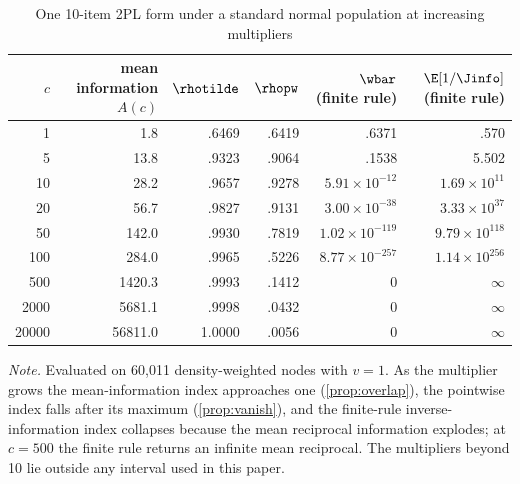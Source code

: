 \begin{table}[!htbp]
\centering
\caption{One 10-item 2PL form under a standard normal population at increasing multipliers}
\label{tab:guttman}
\small
\begin{tabular}{rrrrrr}
\toprule
$c$ & mean information $A(c)$ & $\rhotilde$ & $\rhopw$ & $\wbar$ (finite rule) & $\E[1/\Jinfo]$ (finite rule) \\
\midrule
1 & 1.8 & .6469 & .6419 & .6371 & .570 \\
5 & 13.8 & .9323 & .9064 & .1538 & 5.502 \\
10 & 28.2 & .9657 & .9278 & $5.91\times10^{-12}$ & $1.69\times10^{11}$ \\
20 & 56.7 & .9827 & .9131 & $3.00\times10^{-38}$ & $3.33\times10^{37}$ \\
50 & 142.0 & .9930 & .7819 & $1.02\times10^{-119}$ & $9.79\times10^{118}$ \\
100 & 284.0 & .9965 & .5226 & $8.77\times10^{-257}$ & $1.14\times10^{256}$ \\
500 & 1420.3 & .9993 & .1412 & 0 & $\infty$ \\
2000 & 5681.1 & .9998 & .0432 & 0 & $\infty$ \\
20000 & 56811.0 & 1.0000 & .0056 & 0 & $\infty$ \\
\bottomrule
\end{tabular}

\smallskip
\begin{minipage}{0.95\textwidth}
\footnotesize
\emph{Note.} Evaluated on 60,011 density-weighted nodes with $v=1$. As the multiplier grows the mean-information index approaches one (\cref{prop:overlap}), the pointwise index falls after its maximum (\cref{prop:vanish}), and the finite-rule inverse-information index collapses because the mean reciprocal information explodes; at $c=500$ the finite rule returns an infinite mean reciprocal. The multipliers beyond 10 lie outside any interval used in this paper.
\end{minipage}
\end{table}

